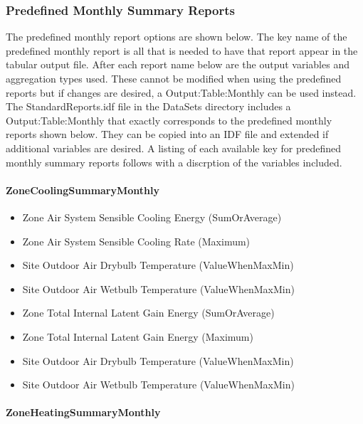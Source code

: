 \subsubsection{Predefined Monthly Summary Reports}\label{predefined-monthly-summary-reports}

The predefined monthly report options are shown below. The key name of the predefined monthly report is all that is needed to have that report appear in the tabular output file. After each report name below are the output variables and aggregation types used. These cannot be modified when using the predefined reports but if changes are desired, a Output:Table:Monthly can be used instead. The StandardReports.idf file in the DataSets directory includes a Output:Table:Monthly that exactly corresponds to the predefined monthly reports shown below. They can be copied into an IDF file and extended if additional variables are desired. A listing of each available key for predefined monthly summary reports follows with a discrption of the variables included.

\paragraph{ZoneCoolingSummaryMonthly}\label{zonecoolingsummarymonthly}

\begin{itemize}
\item
  Zone Air System Sensible Cooling Energy (SumOrAverage)
\item
  Zone Air System Sensible Cooling Rate (Maximum)
\item
  Site Outdoor Air Drybulb Temperature (ValueWhenMaxMin)
\item
  Site Outdoor Air Wetbulb Temperature (ValueWhenMaxMin)
\item
  Zone Total Internal Latent Gain Energy (SumOrAverage)
\item
  Zone Total Internal Latent Gain Energy (Maximum)
\item
  Site Outdoor Air Drybulb Temperature (ValueWhenMaxMin)
\item
  Site Outdoor Air Wetbulb Temperature (ValueWhenMaxMin)
\end{itemize}

\paragraph{ZoneHeatingSummaryMonthly}\label{zoneheatingsummarymonthly}

